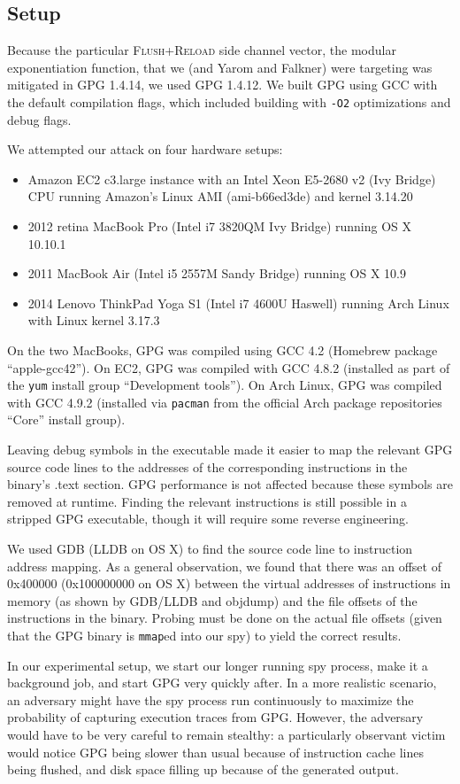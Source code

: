\documentclass[11pt]{llncs}
\newcommand{\flushreload}{\textsc{Flush}+\textsc{Reload}}
\newcommand{\litem}{\item[\lobclaw{simple}] }
\begin{document}
\subsection{Setup}

Because the particular \flushreload{} side channel vector, the modular
exponentiation function, that we (and Yarom and Falkner\cite{YF13}) were
targeting was mitigated in GPG 1.4.14, we used GPG 1.4.12. We built GPG 
using GCC with the default compilation flags, which included
building with \texttt{-O2} optimizations and debug flags.

We attempted our attack on four hardware setups:
\begin{itemize}
    \litem Amazon EC2 c3.large instance with an Intel Xeon E5-2680 v2 (Ivy
        Bridge) CPU running Amazon's Linux AMI (ami-b66ed3de) and kernel 3.14.20
    \litem 2012 retina MacBook Pro (Intel i7 3820QM Ivy Bridge) running OS X
        10.10.1
    \litem 2011 MacBook Air (Intel i5 2557M Sandy Bridge) running OS X 10.9
    \litem 2014 Lenovo ThinkPad Yoga S1 (Intel i7 4600U Haswell) running Arch
        Linux with Linux kernel 3.17.3
\end{itemize}

On the two MacBooks, GPG was compiled using GCC 4.2 (Homebrew package
``apple-gcc42''). On EC2, GPG was compiled with GCC 4.8.2 (installed as part of
the \texttt{yum} install group ``Development tools''). On Arch Linux, GPG was
compiled with GCC 4.9.2 (installed via \texttt{pacman} from the official Arch
package repositories ``Core'' install group).

Leaving debug symbols in the executable made it easier to map the relevant GPG
source code lines to the addresses of the corresponding instructions in the binary's
.text section. GPG performance is not affected because these symbols are removed
at runtime. Finding the relevant instructions is still possible in a stripped
GPG executable, though it will require some reverse engineering.

We used GDB (LLDB on OS X) to find the source code line to instruction address
mapping. As a general observation, we found that there was an offset of 0x400000
(0x100000000 on OS X) between the virtual addresses of instructions in memory
(as shown by GDB/LLDB and objdump) and the file offsets of the instructions in
the binary. Probing must be done on the actual file offsets (given that the GPG
binary is \texttt{mmap}ed into our spy) to yield the correct results.

In our experimental setup, we start our longer running spy process, make it a
background job, and start GPG very quickly after. In a more realistic scenario,
an adversary might have the spy process run continuously to maximize the
probability of capturing execution traces from GPG. However, the adversary would
have to be very careful to remain stealthy: a particularly observant victim
would notice GPG being slower than usual because of instruction cache lines
being flushed, and disk space filling up because of the generated output.
\end{document}
